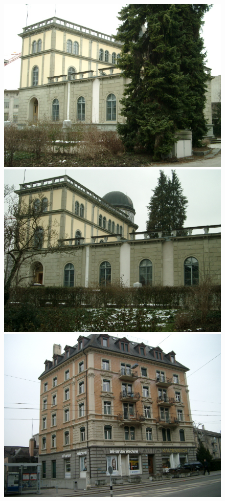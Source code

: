 \documentclass[twocolumn]{article}
\begin{document}
\begin{figure}
			\resizebox{1.95\columnwidth}{!}
			{
				\includegraphics[scale=0.123]{zubud1.png}
				\includegraphics[scale=0.123]{zubud2.png}
				\includegraphics[scale=0.123]{zubud3.png}
}
\end{figure}
\end{document}
